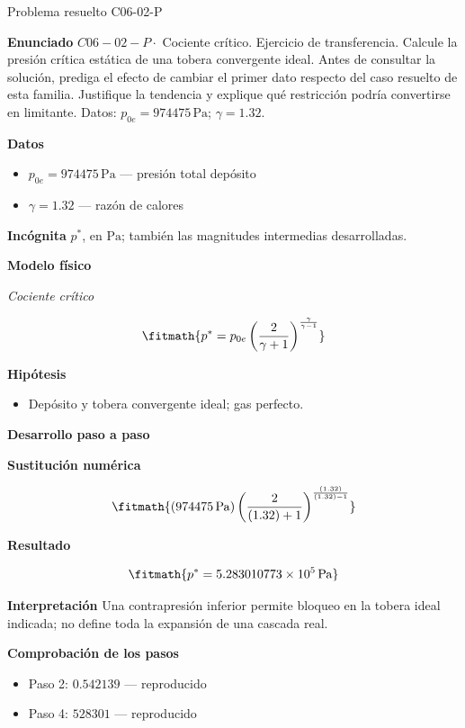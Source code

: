 \documentclass[10pt,openany]{book}
\begin{document}
\begin{studiumworked}{Problema resuelto C06-02-P}


\noindent\textbf{Enunciado}
\(C06-02-P \cdot\) Cociente crítico. Ejercicio de transferencia. Calcule la presión crítica estática de una tobera convergente ideal. Antes de consultar la solución, prediga el efecto de cambiar el primer dato respecto del caso resuelto de esta familia. Justifique la tendencia y explique qué restricción podría convertirse en limitante. Datos: \(p_{0e}=974475\, \mathrm{Pa}\); \(\gamma=1.32\).

\noindent\textbf{Datos}
\begin{itemize}
\item $p_{0e} = 974475\,\mathrm{Pa}$ — presión total depósito
\item $\gamma = 1.32$ — razón de calores
\end{itemize}

\noindent\textbf{Incógnita}
$p^{*}$, en $\mathrm{Pa}$; también las magnitudes intermedias desarrolladas.

\noindent\textbf{Modelo físico}

\noindent\textit{Cociente crítico}

\[
\fitmath{p^{*}=p_{0e} \left(\frac{2}{\gamma + 1}\right)^{\frac{\gamma}{\gamma - 1}}}
\]

\noindent\textbf{Hipótesis}
\begin{itemize}
\item Depósito y tobera convergente ideal; gas perfecto.
\end{itemize}

\noindent\textbf{Desarrollo paso a paso}



\noindent\textbf{Sustitución numérica}

\[
\fitmath{\left(974475\,\mathrm{Pa}\right) \left(\frac{2}{\left(1.32\right) + 1}\right)^{\frac{\left(1.32\right)}{\left(1.32\right) - 1}}}
\]

\noindent\textbf{Resultado}

\[
\fitmath{p^{*}=5.283010773\times10^{5}\,\mathrm{Pa}}
\]

\noindent\textbf{Interpretación}
Una contrapresión inferior permite bloqueo en la tobera ideal indicada; no define toda la expansión de una cascada real.

\noindent\textbf{Comprobación de los pasos}
\begin{itemize}
\item Paso 2: $0.542139$ — reproducido
\item Paso 4: $528301$ — reproducido
\end{itemize}


\end{studiumworked}
\end{document}
